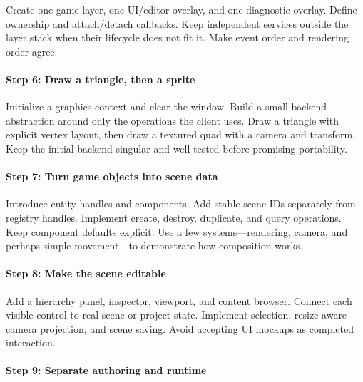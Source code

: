 Create one game layer, one UI/editor overlay, and one diagnostic overlay. Define ownership and attach/detach callbacks. Keep independent services outside the layer stack when their lifecycle does not fit it. Make event order and rendering order agree.

\paragraph{Step 6: Draw a triangle, then a sprite}\label{06-engine-ii-ch042-step-6-draw-a-triangle-then-a-sprite}

\hypertarget{06-engine-ii-ch042-step-6-draw-a-triangle-then-a-sprite}{}

Initialize a graphics context and clear the window. Build a small backend abstraction around only the operations the client uses. Draw a triangle with explicit vertex layout, then draw a textured quad with a camera and transform. Keep the initial backend singular and well tested before promising portability.

\paragraph{Step 7: Turn game objects into scene data}\label{06-engine-ii-ch042-step-7-turn-game-objects-into-scene-data}

\hypertarget{06-engine-ii-ch042-step-7-turn-game-objects-into-scene-data}{}

Introduce entity handles and components. Add stable scene IDs separately from registry handles. Implement create, destroy, duplicate, and query operations. Keep component defaults explicit. Use a few systems---rendering, camera, and perhaps simple movement---to demonstrate how composition works.

\paragraph{Step 8: Make the scene editable}\label{06-engine-ii-ch042-step-8-make-the-scene-editable}

\hypertarget{06-engine-ii-ch042-step-8-make-the-scene-editable}{}

Add a hierarchy panel, inspector, viewport, and content browser. Connect each visible control to real scene or project state. Implement selection, resize-aware camera projection, and scene saving. Avoid accepting UI mockups as completed interaction.

\paragraph{Step 9: Separate authoring and runtime}\label{06-engine-ii-ch042-step-9-separate-authoring-and-runtime}

